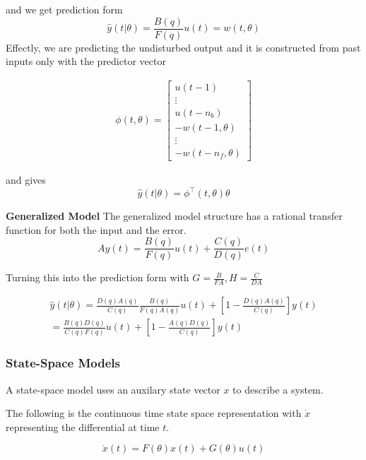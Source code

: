 and we get prediction form
\begin{equation}
    \hat{y}(t|\theta) = \frac{B(q)}{F(q)} u(t) = w(t, \theta)
\end{equation}
Effectly, we are predicting the undisturbed output
and it is constructed from past inputs only with the predictor vector

\begin{align}
    \phi(t,\theta) =
  \begin{bmatrix}
    u(t-1) \\ \vdots \\ u(t-n_b) \\ -w(t-1, \theta) \\ \vdots \\ -w(t-n_f,\theta)
  \end{bmatrix}
\end{align}

and gives
\begin{equation}
    \hat{y}(t|\theta) = \phi^\top (t, \theta) \theta
\end{equation}

\textbf{Generalized Model}
The generalized model structure has a rational transfer function for both the input and the error.
\begin{equation}
    A y(t) = \frac{B(q)}{F(q)} u(t) +  \frac{C(q)}{D(q)} e(t)
\end{equation}

Turning this into the prediction form with $G= \frac{B}{F A}, H=\frac{C}{D A}$

\begin{gather}
    \hat{y}(t|\theta) = \frac{D(q) A(q)}{C(q)} \frac{B(q)}{F(q) A(q)} u(t) + [1 - \frac{D(q) A(q)}{C(q)}] y(t) \\
    = \frac{B(q) D(q)}{C(q) F(q)} u(t) + [1 - \frac{A(q) D(q)}{C(q)}]y(t)
\end{gather}

\subsubsection{State-Space Models}
A state-space model uses an auxilary state vector $x$ to describe a system.

The following is the continuous time state space representation with  $\dot{x}$ representing the differential at time $t$.

\begin{equation}
    \dot{x}(t) = F(\theta) x(t) + G(\theta) u(t)
\end{equation}

